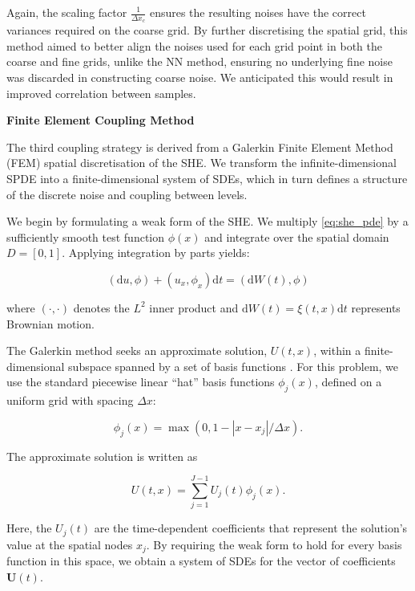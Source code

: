 Again, the scaling factor
$\frac{1}{\Delta x_c}$ ensures the resulting
noises have the correct variances required on 
the coarse grid. 
By further discretising the spatial grid, 
this method aimed to better align the noises 
used for each grid point in both the coarse
and fine grids, unlike the NN method, ensuring
no underlying fine noise was discarded in 
constructing coarse noise. We anticipated this 
would result in improved correlation between samples.
\newline

\textbf{Finite Element Coupling Method}

The third coupling strategy is derived from a Galerkin Finite Element Method
(FEM) \cite{suli2025fe} spatial discretisation of the SHE. We transform 
the infinite-dimensional SPDE into a finite-dimensional system of SDEs, 
which in turn defines a structure of the discrete noise and coupling between 
levels.

We begin by formulating a weak form of the SHE. We multiply \eqref{eq:she_pde} by 
a sufficiently smooth test function $\phi(x)$ and integrate over the spatial domain 
$D = [0,1]$. Applying integration by parts yields:

\begin{equation}\label{eq:she_differential_form}
    (\mathrm{d}u,\phi) + (u_x, \phi_x)\mathrm{d}t = (\mathrm{d}W(t), \phi)
\end{equation}

where $(\cdot, \cdot)$ denotes the $L^2$ inner product and  
$\mathrm{d}W(t) = \xi(t,x)\mathrm{d}t$ represents Brownian
motion.

The Galerkin method seeks an approximate solution, $U(t,x)$, within a finite-dimensional
subspace spanned by a set of basis functions \cite{suli2025fe}. For this problem, 
we use the standard piecewise linear ``hat'' basis functions $\phi_j(x)$, defined on a 
uniform grid with spacing $\Delta x$:

\begin{equation*}
    \phi_j(x) = \max(0, 1 - |x-x_j|/ \Delta x).
\end{equation*}

The approximate solution is written as

\begin{equation*}
    U(t,x) = \sum_{j=1}^{J-1}U_j(t)\phi_j(x).
\end{equation*}

Here, the $U_j(t)$ are the time-dependent coefficients that represent the solution's value at
the spatial nodes $x_j$. By requiring the weak form to hold for every basis function 
in this space, we obtain a system of SDEs for the vector of coefficients $\mathbf{U}(t)$. 

